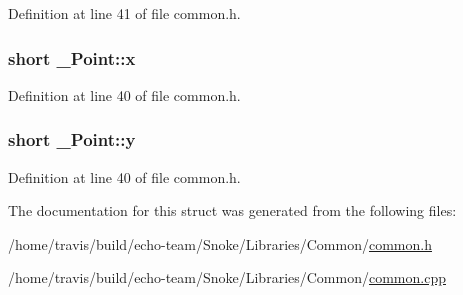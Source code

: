 Definition at line 41 of file common.\-h.

\hypertarget{struct___point_a1c1cb9f2bfc0c90f1079661912b69e48}{
\subsubsection[{x}]{\setlength{\rightskip}{0pt plus 5cm}short \-\_\-\-Point\-::x}}\label{struct___point_a1c1cb9f2bfc0c90f1079661912b69e48}


Definition at line 40 of file common.\-h.

\hypertarget{struct___point_af63bdd5a8c2fcf3fc4701a1cc6a421df}{
\subsubsection[{y}]{\setlength{\rightskip}{0pt plus 5cm}short \-\_\-\-Point\-::y}}\label{struct___point_af63bdd5a8c2fcf3fc4701a1cc6a421df}


Definition at line 40 of file common.\-h.



The documentation for this struct was generated from the following files\-:\begin{DoxyCompactItemize}
\item 
/home/travis/build/echo-\/team/\-Snoke/\-Libraries/\-Common/\hyperlink{common_8h}{common.\-h}\item 
/home/travis/build/echo-\/team/\-Snoke/\-Libraries/\-Common/\hyperlink{common_8cpp}{common.\-cpp}\end{DoxyCompactItemize}

